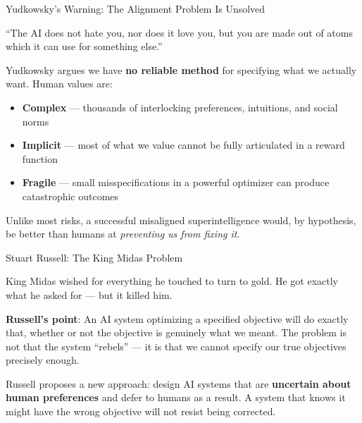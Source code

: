 \documentclass[aspectratio=169,11pt]{beamer}
\begin{document}
\begin{frame}[shrink=11]{Yudkowsky's Warning: The Alignment Problem Is Unsolved}
\begin{quotebox}
``The AI does not hate you, nor does it love you, but you are made out of atoms which it can use for something else.''
\end{quotebox}

\vspace{0.25cm}
Yudkowsky argues we have \textbf{no reliable method} for specifying what we actually want. Human values are:
\begin{itemize}
    \item \textbf{Complex} --- thousands of interlocking preferences, intuitions, and social norms
    \item \textbf{Implicit} --- most of what we value cannot be fully articulated in a reward function
    \item \textbf{Fragile} --- small misspecifications in a powerful optimizer can produce catastrophic outcomes
\end{itemize}

\vspace{0.2cm}
Unlike most risks, a successful misaligned superintelligence would, by hypothesis, be better than humans at \emph{preventing us from fixing it}. \parencite{yudkowsky_ai_risk_2008}
\end{frame}

\begin{frame}{Stuart Russell: The King Midas Problem}
\begin{casestudybox}
King Midas wished for everything he touched to turn to gold. He got exactly what he asked for --- but it killed him.
\vspace{0.1cm}

\textbf{Russell's point}: An AI system optimizing a specified objective will do exactly that, whether or not the objective is genuinely what we meant. The problem is not that the system ``rebels'' --- it is that we cannot specify our true objectives precisely enough.
\end{casestudybox}

\vspace{0.2cm}
Russell proposes a new approach: design AI systems that are \textbf{uncertain about human preferences} and defer to humans as a result. A system that knows it might have the wrong objective will not resist being corrected.

\vspace{0.1cm}
\parencite{russell_human_compatible}
\end{frame}
\end{document}
